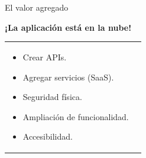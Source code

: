 \begin{frame}{El valor agregado}
  \begin{center}
    \textbf{¡La aplicación está en la nube!}
  \end{center}

  \begin{tabular}{l c}
    \parbox{0.5\textwidth}{
      \begin{itemize}
        \item Crear APIs.
        \item Agregar servicios (SaaS).
        \item Seguridad física.
        \item Ampliación de funcionalidad.
        \item Accesibilidad.
      \end{itemize}
    } &
     \\
  \end{tabular}
\end{frame}
